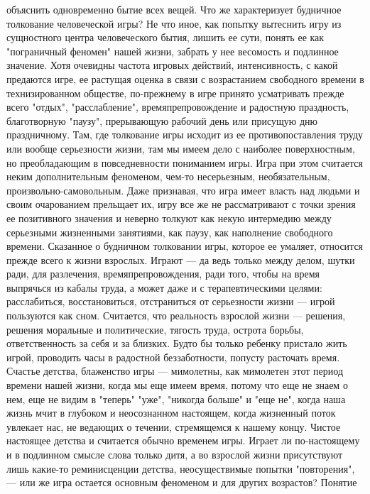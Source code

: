 \documentclass[12pt]{article}
\begin{document}
объяснить одновременно бытие всех вещей.
Что же характеризует будничное толкование человеческой игры? Не что иное, как попытку вытеснить игру из
сущностного центра человеческого бытия, лишить ее сути, понять ее как "пограничный феномен" нашей жизни,
забрать у нее весомость и подлинное значение. Хотя очевидны частота игровых действий, интенсивность, с
какой предаются игре, ее растущая оценка в связи с возрастанием свободного времени в технизированном
обществе,  по-прежнему  в  игре  принято  усматривать  прежде  всего  "отдых",  "расслабление",
времяпрепровождение  и  радостную  праздность,  благотворную  "паузу",  прерывающую  рабочий  день  или
присущую дню праздничному. Там, где толкование игры исходит из ее противопоставления труду или вообще
серьезности жизни, там мы имеем дело с наиболее поверхностным, но преобладающим в повседневности
пониманием  игры.  Игра  при  этом  считается  неким  дополнительным  феноменом,  чем-то  несерьезным,
необязательным,  произвольно-самовольным.  Даже  признавая,  что  игра  имеет  власть  над  людьми  и  своим
очарованием прельщает их, игру все же не рассматривают с точки зрения ее позитивного значения и неверно
толкуют  как  некую  интермедию  между  серьезными  жизненными  занятиями,  как  паузу,  как  наполнение
свободного времени. Сказанное о будничном толковании игры, которое ее умаляет, относится прежде всего к
жизни взрослых. Играют --- да ведь только между делом, шутки ради, для разлечения, времяпрепровождения,
ради  того,  чтобы  на  время  выпрячься  из  кабалы  труда,  а  может  даже  и  с  терапевтическими  целями:
расслабиться, восстановиться, отстраниться от серьезности жизни --- игрой пользуются как сном. Считается, что
реальность взрослой жизни --- решения, решения моральные и политические, тягость труда, острота борьбы,
ответственность  за  себя  и  за  близких.  Будто  бы  только  ребенку  пристало  жить  игрой,  проводить  часы  в
радостной  беззаботности,  попусту  расточать  время.  Счастье  детства,  блаженство  игры  ---  мимолетны,  как
мимолетен этот период времени нашей жизни, когда мы еще имеем время, потому что еще не знаем о нем, еще
не видим в "теперь" "уже", "никогда больше" и "еще не", когда наша жизнь мчит в глубоком и неосознанном
настоящем, когда жизненный поток увлекает нас, не ведающих о течении, стремящемся к нашему концу. Чистое
настоящее детства и считается обычно временем игры. Играет ли по-настоящему и в подлинном смысле слова
только  дитя,  а  во  взрослой  жизни  присутствуют  лишь  какие-то  реминисценции  детства,  неосуществимые
попытки  "повторения", ---  или  же  игра  остается  основным  феноменом  и  для  других  возрастов?  Понятие
\end{document}
